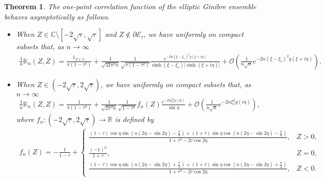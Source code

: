 \documentclass[%
 jmp,
cp,  %
 amsmath,amsthm,amssymb,%
 reprint,%
onecolumn]{revtex4-2}
\newtheorem{theorem}{Theorem}[section]
\newtheorem{corollary}[theorem]{Corollary}
\begin{document}

\begin{theorem} \label{thm:onepointAsymp}
The one-point correlation function of the elliptic Ginibre ensemble behaves asymptotically as follows. 
\begin{itemize}
\item[(i)] When $Z\in \mathbb C\setminus [-2\sqrt \tau, \sqrt \tau]$ and $Z\not\in \partial \mathcal E_\tau$, we have uniformly on compact subsets that, as $n\to\infty$
\begin{align*}
\frac{1}{n} \mathbb K_n(Z, Z)
= \frac{\mathfrak{1}_{Z\in \mathcal E_\tau}}{\pi (1-\tau^2)}
+\frac{1}{\sqrt{32 \pi^3 n}} \frac{1}{\sqrt{\tau(1-\tau^2)}} 
\frac{e^{-2 n (\xi-\xi_\tau)^2 g(\xi+i\eta)}}{\sinh(\xi-\xi_\tau) \lvert \sinh(\xi+i\eta)\rvert} 
+ \mathcal O\left(\frac{1}{n\sqrt n} e^{-2 n (\xi-\xi_\tau)^2 g(\xi+i\eta)}\right).
\end{align*}
\item[(ii)] When $Z\in (-2\sqrt\tau,2\sqrt\tau)$, we have uniformly on compact subsets that, as $n\to\infty$
\begin{align} \label{eq:EGEiiOnePointC}
\frac{1}{n} \mathbb K_n(Z, Z)
= \frac{1}{\pi (1-\tau^2)}
+\frac{1}{\sqrt{2 \pi^3 n}} \frac{1}{\sqrt{1-\tau^2}} f_n(Z) 
\frac{e^{-2 n \xi_\tau^2 g(i\eta)}}{\sin\eta}
+ \mathcal O\left(\frac{1}{n\sqrt n} e^{-2 n \xi_\tau^2 g(i\eta)}\right),
\end{align}
where $f_n:(-2\sqrt \tau, 2\sqrt\tau)\to \mathbb R$ is defined by
\begin{align*}
f_n(Z) =- \frac{1}{1-\tau} + 
\begin{cases}
\displaystyle  \frac{(1-\tau) \cos \eta \sin\left(n(2\eta-\sin 2\eta) - \frac{\pi}{4}\right) + (1+\tau) \sin \eta \cos\left(n(2\eta-\sin 2\eta) - \frac{\pi}{4}\right)}{1+\tau^2-2\tau\cos 2\eta}, & Z> 0,\\
\displaystyle\frac{(-1)^n}{1+\tau}, & Z=0,\\
\displaystyle \frac{(1-\tau) \cos \eta \sin \left(n(2\eta-\sin 2\eta) + \frac{\pi}{4}\right) + (1+\tau) \sin \eta \cos\left(n(2\eta-\sin 2\eta) + \frac{\pi}{4}\right)}{1+\tau^2-2\tau\cos 2\eta}, & Z< 0.

\end{cases}
\end{align*}
\end{itemize}
\end{theorem}
\end{document}
